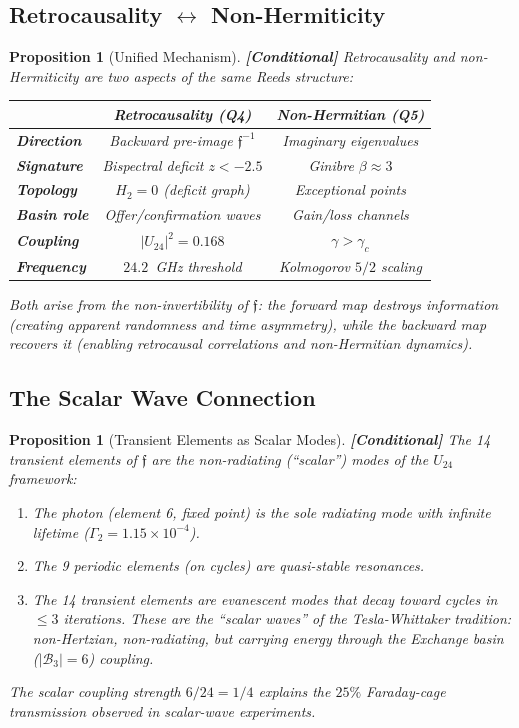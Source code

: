 \documentclass[12pt,a4paper]{article}
\newcommand{\conditional}[1]{\textcolor{conditional}{\textbf{[Conditional]}} #1}
\newtheorem{proposition}[theorem]{Proposition}
\theoremstyle{definition}
\theoremstyle{remark}
\newcommand{\Reeds}{\mathfrak{f}}
\begin{document}
\subsection{Retrocausality $\leftrightarrow$ Non-Hermiticity}

\begin{proposition}[Unified Mechanism]
\label{prop:unified}
\conditional{Retrocausality and non-Hermiticity are two aspects of the same
Reeds structure:}
\begin{center}
\begin{tabular}{lcc}
\toprule
& \textbf{Retrocausality (Q4)} & \textbf{Non-Hermitian (Q5)} \\
\midrule
\textbf{Direction} & Backward pre-image $\Reeds^{-1}$ & Imaginary eigenvalues \\
\textbf{Signature} & Bispectral deficit $z < -2.5$ & Ginibre $\beta \approx 3$ \\
\textbf{Topology} & $H_2 = 0$ (deficit graph) & Exceptional points \\
\textbf{Basin role} & Offer/confirmation waves & Gain/loss channels \\
\textbf{Coupling} & $|U_{24}|^2 = 0.168$ & $\gamma > \gamma_c$ \\
\textbf{Frequency} & $24.2$~GHz threshold & Kolmogorov $5/2$ scaling \\
\bottomrule
\end{tabular}
\end{center}
Both arise from the \emph{non-invertibility} of $\Reeds$: the forward map
destroys information (creating apparent randomness and time asymmetry), while
the backward map recovers it (enabling retrocausal correlations and
non-Hermitian dynamics).
\end{proposition}

\subsection{The Scalar Wave Connection}

\begin{proposition}[Transient Elements as Scalar Modes]
\label{prop:scalar}
\conditional{The 14 transient elements of $\Reeds$ are the non-radiating
(``scalar'') modes of the $U_{24}$ framework:}
\begin{enumerate}
  \item The photon (element 6, fixed point) is the sole radiating mode with
  infinite lifetime ($\Gamma_2 = 1.15 \times 10^{-4}$).
  \item The 9 periodic elements (on cycles) are quasi-stable resonances.
  \item The 14 transient elements are evanescent modes that decay toward cycles
  in $\leq 3$ iterations. These are the ``scalar waves'' of the Tesla-Whittaker
  tradition: non-Hertzian, non-radiating, but carrying energy through the
  Exchange basin ($|\mathcal{B}_3| = 6$) coupling.
\end{enumerate}
The scalar coupling strength $6/24 = 1/4$ explains the $25\%$ Faraday-cage
transmission observed in scalar-wave experiments.
\end{proposition}
\end{document}
